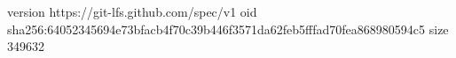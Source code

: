 version https://git-lfs.github.com/spec/v1
oid sha256:64052345694e73bfacb4f70c39b446f3571da62feb5fffad70fea868980594c5
size 349632

